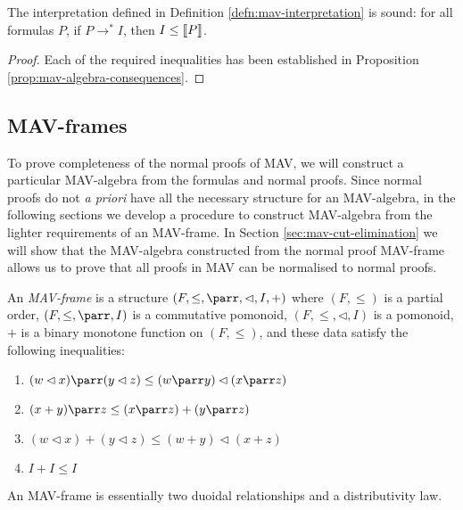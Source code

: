\begin{theorem}\label{thm:soundness}
  The interpretation defined in Definition
  \ref{defn:mav-interpretation} is sound: for all formulas $P$, if
  $P \longrightarrow^* I$, then $I \leq \llbracket P \rrbracket$.
\end{theorem}

\begin{proof}
  Each of the required inequalities has been established in
  Proposition \ref{prop:mav-algebra-consequences}.
\end{proof}

\subsection{MAV-frames}

To prove completeness of the normal proofs of MAV, we will construct a
particular MAV-algebra from the formulas and normal proofs. Since
normal proofs do not {\it a priori} have all the necessary structure
for an MAV-algebra, in the following sections we develop a procedure
to construct MAV-algebra from the lighter requirements of an
MAV-frame. In Section \ref{sec:mav-cut-elimination} we will show that
the MAV-algebra constructed from the normal proof MAV-frame allows us
to prove that all proofs in MAV can be normalised to normal proofs.

\begin{definition}\label{defn:mav-frame}
  An \emph{MAV-frame} is a structure $(F, \leq, \parr, \lhd, I, +)$
  where $(F, \leq)$ is a partial order, $(F, \leq, \parr, I)$ is a
  commutative pomonoid, $(F, \leq, \lhd, I)$ is a pomonoid, $+$ is a
  binary monotone function on $(F, \leq)$, and these data satisfy the
  following inequalities:
  \begin{enumerate}
    \item $(w \lhd x) \parr (y \lhd z) \leq (w \parr y) \lhd (x \parr z)$
    \item $(x + y) \parr z \leq (x \parr z) + (y \parr z)$
    \item $(w \lhd x) + (y \lhd z) \leq (w + y) \lhd (x + z)$
    \item $I + I \leq I$
  \end{enumerate}
\end{definition}

\begin{remark}
  An MAV-frame is essentially two duoidal relationships and a
  distributivity law.
\end{remark}

